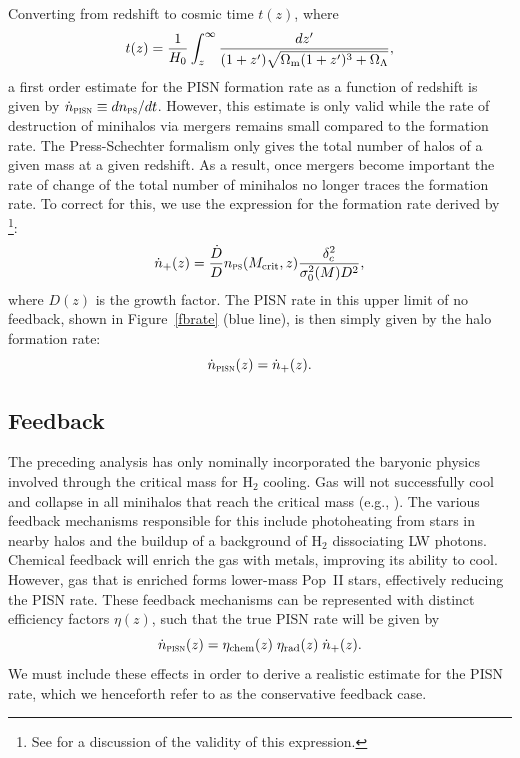 \documentclass{thesis}
\newcommand{\RefFig}[1]{\mbox{Figure~\ref{#1}}}
\begin{document}
Converting from redshift to cosmic time $t(z)$, where
\begin{equation} 
t(z) = \frac{1}{H_0}
\int_z^{\infty}\frac{dz'}{(1+z')\sqrt{\Omega_{\rm m} (1+z')^3 + \Omega_{\Lambda}}} ,
\end{equation} 
a first order estimate for the PISN formation rate as a function
of redshift is given by $\dot{n}_{\textsc{pisn}}\equiv
dn_{\textsc{ps}}/dt$. However, this estimate is only valid while the
rate of destruction of minihalos via mergers remains small compared to
the formation rate. The Press-Schechter formalism only gives the total
number of halos of a given mass at a given redshift. As a result, once
mergers become important the rate of change of the total number of
minihalos no longer traces the formation rate. To correct for this, we
use the expression for the formation rate derived by
\citet{Sasaki1994}\footnote{See \citet{Mitraetal2011}
  for a discussion of the validity of this expression.}:
\begin{equation}
\dot{n}_{+}(z) = \frac{\dot{D}}{D} n_{\textsc{ps}}(M_{\rm crit},z)
\frac{\delta_c^2}{\sigma^2_0(M) D^2},
\end{equation}
where $D(z)$ is the growth factor.  The PISN rate
in this upper limit of no feedback, shown in \RefFig{fbrate} (blue
line), is then simply given by the halo formation rate:
\begin{equation}
\dot{n}_{\textsc{pisn}}(z) = \dot{n}_{+}(z).
\end{equation}

\subsection{Feedback}
The preceding analysis has only nominally incorporated the baryonic
physics involved through the critical mass for H$_2$ cooling. Gas will
not successfully cool and collapse in all minihalos that reach the
critical mass (e.g., \citealt{Yoshidaetal2003}). The various feedback
mechanisms responsible for this include photoheating from stars in
nearby halos and the buildup of a background of H$_2$ dissociating LW
photons. Chemical feedback will enrich the gas with metals, improving
its ability to cool.  However, gas that is enriched forms lower-mass
Pop~II stars, effectively reducing the PISN rate. These
feedback mechanisms can be represented with distinct efficiency
factors $\eta(z)$, such that the true PISN rate will be given by
\begin{equation}
  \dot{n}_{\textsc{pisn}}(z) = 
  \eta_{\rm chem}(z) \; \eta_{\rm rad}(z) \; \dot{n}_{+}(z).
  \label{pisnrate1}
\end{equation}
We must include these effects in order to derive a realistic estimate
for the PISN rate, which we henceforth refer to as the conservative
feedback case.
\end{document}
